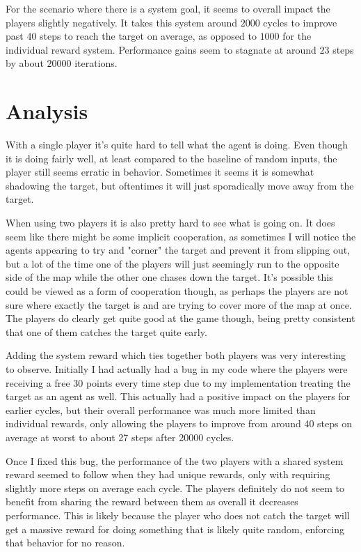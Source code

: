 \documentclass[sigconf]{aamas}
\begin{document}
For the scenario where there is a system goal, it seems to overall impact 
the players slightly negatively. It takes this system around $2000$ cycles 
to improve past $40$ steps to reach the target on average, as opposed to 
$1000$ for the individual reward system. Performance gains seem to stagnate 
at around $23$ steps by about $20000$ iterations.


\section{Analysis}

With a single player it's quite hard to tell what the agent is doing. Even though
it is doing fairly well, at least compared to the baseline of random inputs, the 
player still seems erratic in behavior. Sometimes it seems it is somewhat shadowing 
the target, but oftentimes it will just sporadically move away from the target.

When using two players it is also pretty hard to see what is going on. It does seem 
like there might be some implicit cooperation, as sometimes I will notice the agents 
appearing to try and "corner" the target and prevent it from slipping out, but a lot 
of the time one of the players will just seemingly run to the opposite side of the map 
while the other one chases down the target. It's possible this could be viewed as a 
form of cooperation though, as perhaps the players are not sure where exactly the target 
is and are trying to cover more of the map at once. The players do clearly get quite 
good at the game though, being pretty consistent that one of them catches the target 
quite early.

Adding the system reward which ties together both players was very interesting to 
observe. Initially I had actually had a bug in my code where the players were 
receiving a free 30 points every time step due to my implementation treating the target
as an agent as well. This actually had a positive impact on the players for earlier cycles,
but their overall performance was much more limited than individual rewards, only allowing 
the players to improve from around 40 steps on average at worst to about 27 steps after 
20000 cycles. 

Once I fixed this bug, the performance of the two players with a shared system reward
seemed to follow when they had unique rewards, only with requiring slightly more steps
on average each cycle. The players definitely do not seem to benefit from sharing the 
reward between them as overall it decreases performance. This is likely because the 
player who does not catch the target will get a massive reward for doing something that
is likely quite random, enforcing that behavior for no reason.
\end{document}
